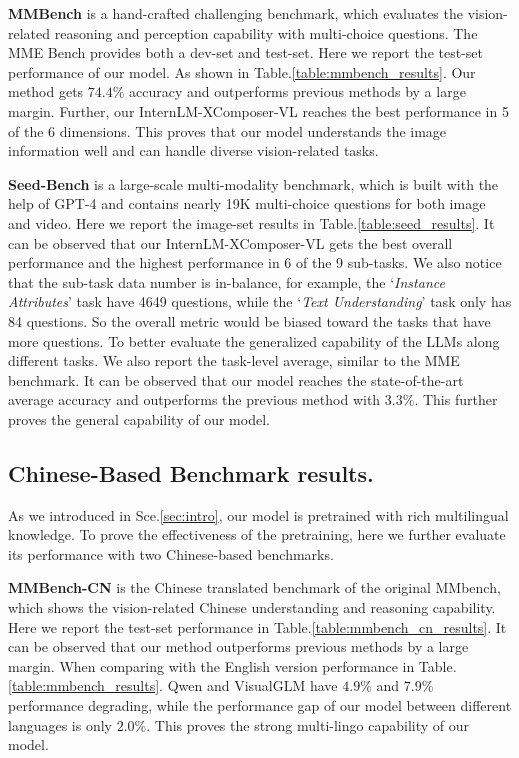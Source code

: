 \documentclass[10pt,twocolumn,letterpaper]{article}
\begin{document}
\noindent\textbf{MMBench} is a hand-crafted challenging benchmark, which evaluates the vision-related reasoning and perception capability with multi-choice questions. The MME Bench provides both a dev-set and test-set.
Here we report the test-set performance of our model. As shown in Table.\ref{table:mmbench_results}. Our method gets $74.4\%$ accuracy and outperforms previous methods by a large margin. Further, our InternLM-XComposer-VL reaches the best performance in 5 of the 6 dimensions. This proves that our model understands the image information well and can handle diverse vision-related tasks.



\noindent\textbf{Seed-Bench} is a large-scale multi-modality benchmark, which is built with the help of GPT-4 and contains nearly 19K multi-choice questions for both image and video. Here we report the image-set results in Table.\ref{table:seed_results}. It can be observed that our InternLM-XComposer-VL gets the best overall performance and the highest performance in 6 of the 9 sub-tasks. We also notice that the sub-task data number is in-balance, for example, the `\textit{Instance Attributes}' task have 4649 questions, while the `\textit{Text Understanding}' task only has 84 questions. So the overall metric would be biased toward the tasks that have more questions. To better evaluate the generalized capability of the LLMs along different tasks. We also report the task-level average, similar to the MME benchmark. It can be observed that our model reaches the state-of-the-art average accuracy and outperforms the previous method with $3.3\%$. This further proves the general capability of our model.



\subsection{Chinese-Based Benchmark results.}
As we introduced in Sce.\ref{sec:intro}, our model is pretrained with rich multilingual knowledge. To prove the effectiveness of the pretraining, here we further evaluate its performance with two Chinese-based benchmarks.

\noindent\textbf{MMBench-CN} is the Chinese translated benchmark of the original MMbench, which shows the vision-related Chinese understanding and reasoning capability. 
Here we report the test-set performance in Table.\ref{table:mmbench_cn_results}. It can be observed that our method outperforms previous methods by a large margin. When comparing with the English version performance in Table.\ref{table:mmbench_results}. Qwen and VisualGLM have $4.9\%$ and  $7.9\%$ performance degrading, while the performance gap of our model between different languages is only $2.0\%$. This proves the strong multi-lingo capability of our model.
\end{document}
